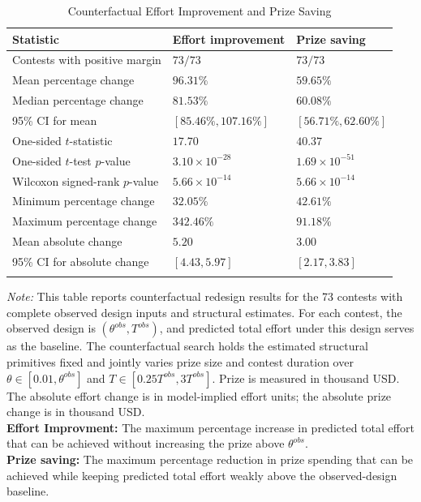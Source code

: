 \documentclass[mnsc]{informs3}
\begin{document}
\begin{table}[htbp]
\centering
\caption{Counterfactual Effort Improvement and Prize Saving}
\label{tab-counterfactual-policy}
\begin{tabularx}{\textwidth}{lYY}
\toprule
\textbf{Statistic} & \textbf{Effort improvement} & \textbf{Prize saving} \\
\midrule
Contests with positive margin & $73/73$ & $73/73$ \\
Mean percentage change & $96.31\%$ & $59.65\%$ \\
Median percentage change & $81.53\%$ & $60.08\%$ \\
95\% CI for mean & $[85.46\%,107.16\%]$ & $[56.71\%,62.60\%]$ \\
One-sided $t$-statistic & $17.70$ & $40.37$ \\
One-sided $t$-test $p$-value & $3.10\times10^{-28}$ & $1.69\times10^{-51}$ \\
Wilcoxon signed-rank $p$-value & $5.66\times10^{-14}$ & $5.66\times10^{-14}$ \\
Minimum percentage change & $32.05\%$ & $42.61\%$ \\
Maximum percentage change & $342.46\%$ & $91.18\%$ \\
Mean absolute change & $5.20$ & $3.00$ \\
95\% CI for absolute change & $[4.43,5.97]$ & $[2.17,3.83]$ \\
\bottomrule
\addlinespace[0.5ex]
\end{tabularx}
\begin{minipage}{\textwidth}
{\footnotesize
\textit{Note:}
This table reports counterfactual redesign results for the 73 contests with complete observed design inputs and structural estimates. For each contest, the observed design is $(\theta^{obs},T^{obs})$, and predicted total effort under this design serves as the baseline. The counterfactual search holds the estimated structural primitives fixed and jointly varies prize size and contest duration over $\theta\in[0.01,\theta^{obs}]$ and $T\in[0.25T^{obs},3T^{obs}]$. 
Prize is measured in thousand USD. The absolute effort change is in model-implied effort units; the absolute prize change is in thousand USD.
\\
\textbf{Effort Improvment:} The maximum percentage increase in predicted total effort that can be achieved without increasing the prize above $\theta^{obs}$.
\\
\textbf{Prize saving:} The maximum percentage reduction in prize spending that can be achieved while keeping predicted total effort weakly above the observed-design baseline. 
}
\end{minipage}
\end{table}
\end{document}
